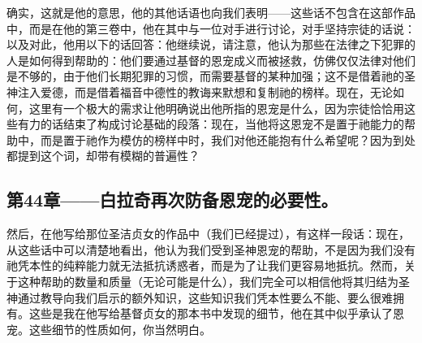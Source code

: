 确实，这就是他的意思，他的其他话语也向我们表明——这些话不包含在这部作品中，而是在他的第三卷中，他在其中与一位对手进行讨论，对手坚持宗徒的话说：以及对此，他用以下的话回答：他继续说，请注意，他认为那些在法律之下犯罪的人是如何得到帮助的：他们要通过基督的恩宠成义而被拯救，仿佛仅仅法律对他们是不够的，由于他们长期犯罪的习惯，而需要基督的某种加强；这不是借着祂的圣神注入爱德，而是借着福音中德性的教诲来默想和复制祂的榜样。现在，无论如何，这里有一个极大的需求让他明确说出他所指的恩宠是什么，因为宗徒恰恰用这些有力的话结束了构成讨论基础的段落：现在，当他将这恩宠不是置于祂能力的帮助中，而是置于祂作为模仿的榜样中时，我们对他还能抱有什么希望呢？因为到处都提到这个词，却带有模糊的普遍性？\par


\subsection{第44章——白拉奇再次防备恩宠的必要性。}

然后，在他写给那位圣洁贞女的作品中（我们已经提过），有这样一段话：现在，从这些话中可以清楚地看出，他认为我们受到圣神恩宠的帮助，不是因为我们没有祂凭本性的纯粹能力就无法抵抗诱惑者，而是为了让我们更容易地抵抗。然而，关于这种帮助的数量和质量（无论可能是什么），我们完全可以相信他将其归结为圣神通过教导向我们启示的额外知识，这些知识我们凭本性要么不能、要么很难拥有。这些是我在他写给基督贞女的那本书中发现的细节，他在其中似乎承认了恩宠。这些细节的性质如何，你当然明白。\par


